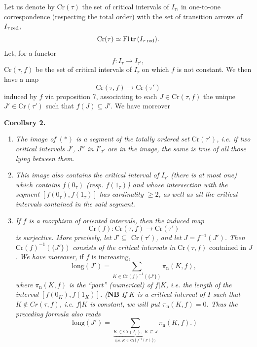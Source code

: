 \documentclass[11pt]{article}
\newcommand{\msp}[1]{\marginpar{\footnotesize [#1]}}
\newcommand{\red}{\text{\upshape red}}
\begin{document}
Let us denote by $\mathrm{Cr}(\tau)$ the set of critical intervals of $I_\tau$, in one-to-one correspondence (respecting the total order) with the set of transition arrows of $I_{\tau\,\red}$, %
\[
\mathrm{Cr}(\tau)\simeq\mathrm{Fl}\,\mathrm{tr}\,(I_{\tau\,\red}).
\]
Let, for a functor
\[
f : I_\tau\longrightarrow I_{\tau'},
\]
$\mathrm{Cr}(\tau,f)$ be the set of critical intervals of $I_\tau$ on which $f$ is not constant. We then have a map
\[
\mathrm{Cr}(\tau,f)\longrightarrow\mathrm{Cr}(\tau') \tag*{$(*)$} %
\]
induced by $f$ via proposition 7, associating to each $J\in\mathrm{Cr}(\tau,f)$ the unique $J'\in\mathrm{Cr}(\tau')$ such that $f(J)\subseteq J'$. We have moreover

\textbf{Corollary 2.}
\begin{enumerate}
\item[\textit{a)}] \textit{The image of $(*)$ is a segment of the totally ordered set} $\mathrm{Cr}(\tau')$\textit{, i.e. if two critical intervals $J'$, $J''$ in $I'_{\tau'}$ are in the image, the same is true of all} %
\msp{page 36}
\textit{those lying between them.}
\item[\textit{b)}] \textit{This image also contains the critical interval of $I_{\tau'}$ (there is at most one) which contains $f(0_\tau)$ (resp. $f(1_\tau)$) and whose intersection with the segment $[f(0_\tau),f(1_\tau)]$ has cardinality $\geq 2$, as well as all the critical intervals contained in the said segment.}
\item[\textit{c)}] \textit{If $f$ is a morphism of oriented intervals, then the induced map}
\[
\mathrm{Cr}(f):\mathrm{Cr}(\tau,f)\longrightarrow\mathrm{Cr}(\tau')
\]
\textit{is surjective. More precisely, let $J'\subseteq$} $\mathrm{Cr}(\tau')$\textit{, and let $J=f^{-1}(J')$. Then} $\mathrm{Cr}(f)^{-1}(\{J'\})$ \textit{consists of the critical intervals in} $\mathrm{Cr}(\tau,f)$ contained in $J$. \textit{We have moreover,} if $f$ is increasing, %
\[
\mathrm{long}(J')=\sum_{K\in\mathrm{Cr}(f)^{-1}(\{J'\})}\pi_{\mathrm{n}}(K,f),
\]
\textit{where $\pi_{\mathrm{n}}(K,f)$ is the ``part'' (numerical) of $f|K$, i.e. the length of the interval $[f(0_K),f(1_K)]$. (}\textbf{NB} \textit{If $K$ is a critical interval of $I$ such that $K\notin Cr(\tau,f)$, i.e. $f|K$ is constant, we will put $\pi_{\mathrm{n}}(K,f)=0$. Thus the preceding formula also reads}
\[
\mathrm{long}(J')=\sum\limits_{\underbrace{K\in\mathrm{Cr}(I_\tau),\ K\subseteq J}_{\text{(i.e. }K\,\in\,\mathrm{Cr}(f^{-1}(J'))\text{)}}}\pi_{\mathrm{n}}(K,f).\ \textit{)}
\]
\end{enumerate}
\end{document}
